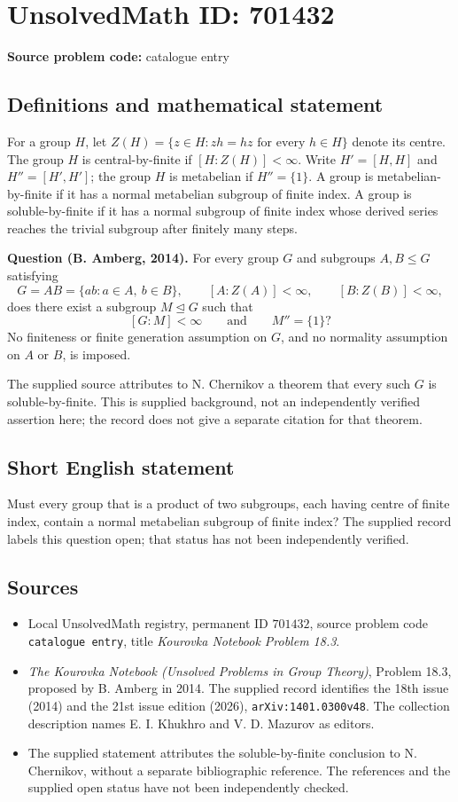 \documentclass[11pt]{article}
\begin{document}
\section*{UnsolvedMath ID: 701432}
\textbf{Source problem code:} catalogue entry
\subsection{Definitions and mathematical statement}
For a group \(H\), let \(Z(H)=\{z\in H:zh=hz\text{ for every }h\in H\}\) denote its centre. The group \(H\) is central-by-finite if \([H:Z(H)]<\infty\). Write \(H'=[H,H]\) and \(H''=[H',H']\); the group \(H\) is metabelian if \(H''=\{1\}\). A group is metabelian-by-finite if it has a normal metabelian subgroup of finite index. A group is soluble-by-finite if it has a normal subgroup of finite index whose derived series reaches the trivial subgroup after finitely many steps.

\textbf{Question (B. Amberg, 2014).} For every group \(G\) and subgroups \(A,B\leq G\) satisfying
\[
G=AB=\{ab:a\in A,\ b\in B\},\qquad [A:Z(A)]<\infty,\qquad [B:Z(B)]<\infty,
\]
does there exist a subgroup \(M\trianglelefteq G\) such that
\[
[G:M]<\infty\qquad\text{and}\qquad M''=\{1\}?
\]
No finiteness or finite generation assumption on \(G\), and no normality assumption on \(A\) or \(B\), is imposed.

The supplied source attributes to N. Chernikov a theorem that every such \(G\) is soluble-by-finite. This is supplied background, not an independently verified assertion here; the record does not give a separate citation for that theorem.
\subsection{Short English statement}
Must every group that is a product of two subgroups, each having centre of finite index, contain a normal metabelian subgroup of finite index? The supplied record labels this question open; that status has not been independently verified.
\subsection{Sources}
\begin{itemize}
\item Local UnsolvedMath registry, permanent ID \(701432\), source problem code \texttt{catalogue entry}, title \emph{Kourovka Notebook Problem 18.3}.
\item \emph{The Kourovka Notebook (Unsolved Problems in Group Theory)}, Problem 18.3, proposed by B. Amberg in 2014. The supplied record identifies the 18th issue (2014) and the 21st issue edition (2026), \texttt{arXiv:1401.0300v48}. The collection description names E. I. Khukhro and V. D. Mazurov as editors.
\item The supplied statement attributes the soluble-by-finite conclusion to N. Chernikov, without a separate bibliographic reference. The references and the supplied open status have not been independently checked.
\end{itemize}
\end{document}

